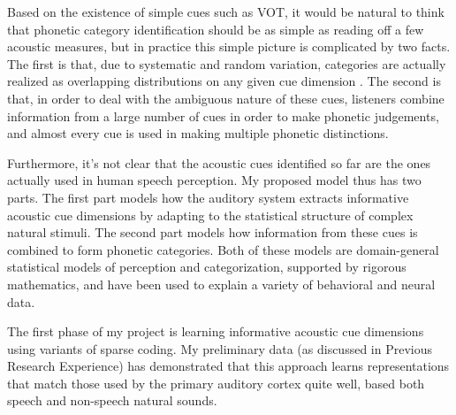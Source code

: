\documentclass[12pt]{article}
\begin{document}
Based on the existence of simple cues such as VOT, it would be natural to think that phonetic category identification should be as simple as reading off a few acoustic measures, but in practice this simple picture is complicated by two facts.  The first is that, due to systematic and random variation, categories are actually realized as overlapping distributions on any given cue dimension \cite{Hillenbrand1995}.  The second is that, in order to deal with the ambiguous nature of these cues, listeners combine information from a large number of cues in order to make phonetic judgements, and almost every cue is used in making multiple phonetic distinctions.  


Furthermore, it's not clear that the acoustic cues identified so far are the ones actually used in human speech perception.  My proposed model thus has two parts.  The first part models how the auditory system extracts informative acoustic cue dimensions by adapting to the statistical structure of complex natural stimuli.  The second part models how information from these cues is combined to form phonetic categories.  Both of these models are domain-general statistical models of perception and categorization, supported by rigorous mathematics, and have been used to explain a variety of behavioral and neural data.

The first phase of my project is learning informative acoustic cue dimensions using variants of sparse coding.  My preliminary data\cite{Kleinschmidt2010} (as discussed in Previous Research Experience) has demonstrated that this approach learns representations that match those used by the primary auditory cortex quite well, based both speech and non-speech natural sounds.

\end{document}
